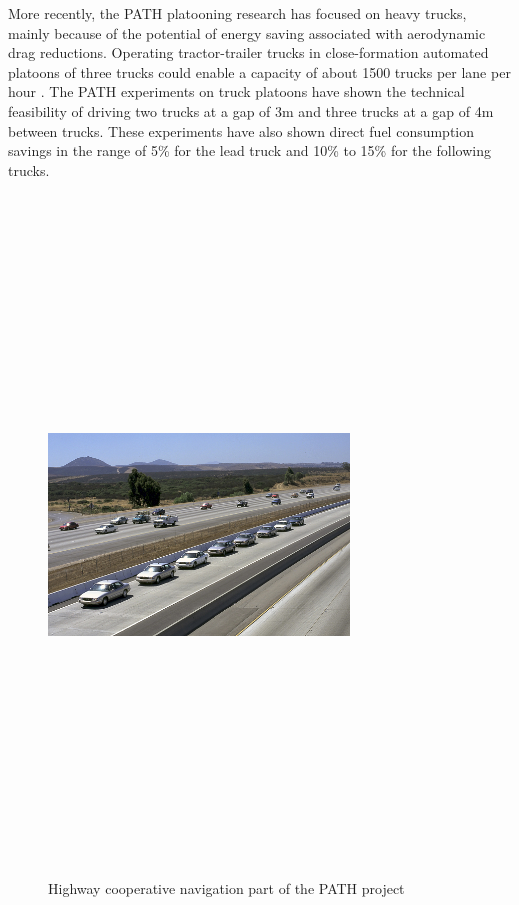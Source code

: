 More recently, the PATH platooning research has focused on heavy trucks, mainly because of the potential of energy saving associated with aerodynamic drag reductions. Operating tractor-trailer trucks in close-formation automated platoons of three trucks could enable a capacity of about 1500 trucks per lane per hour \cite{bergenhem2012overview}. The PATH experiments on truck platoons have shown the technical feasibility of driving two trucks at a gap of 3m and three trucks at a gap of 4m between trucks. These experiments have also shown direct fuel consumption savings in the range of 5\% for the lead truck and 10\% to 15\% for the following trucks. 

\begin{figure}[!h]
        \centering 
        \includegraphics[width=8cm,height=18cm,keepaspectratio]{chapters/Chapitre_2/Figures/Path_project.png}
        \caption{Highway cooperative navigation part of the PATH project \cite{PathReport}}
        \label{fig:path_project}
        \end{figure}






